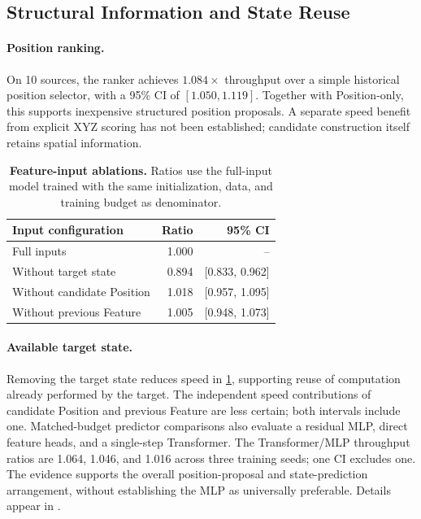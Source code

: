 \subsection{Structural Information and State Reuse}
\paragraph{Position ranking.}
On 10 sources, the ranker achieves $1.084\times$ throughput over a simple historical position selector, with a 95\% CI of $[1.050,1.119]$. Together with Position-only, this supports inexpensive structured position proposals. A separate speed benefit from explicit XYZ scoring has not been established; candidate construction itself retains spatial information.

\begin{table}[t]
\centering\small
\caption{\textbf{Feature-input ablations.} Ratios use the full-input model trained with the same initialization, data, and training budget as denominator.}
\label{tab:inputs}
\begin{tabular}{@{}lrr@{}}\toprule
Input configuration & Ratio & 95\% CI\\\midrule
Full inputs & 1.000 & --\\
Without target state & 0.894 & [0.833, 0.962]\\
Without candidate Position & 1.018 & [0.957, 1.095]\\
Without previous Feature & 1.005 & [0.948, 1.073]\\\bottomrule
\end{tabular}
\end{table}

\paragraph{Available target state.}
Removing the target state reduces speed in \cref{tab:inputs}, supporting reuse of computation already performed by the target. The independent speed contributions of candidate Position and previous Feature are less certain; both intervals include one. Matched-budget predictor comparisons also evaluate a residual MLP, direct feature heads, and a single-step Transformer. The Transformer/MLP throughput ratios are 1.064, 1.046, and 1.016 across three training seeds; one CI excludes one. The evidence supports the overall position-proposal and state-prediction arrangement, without establishing the MLP as universally preferable. Details appear in .

